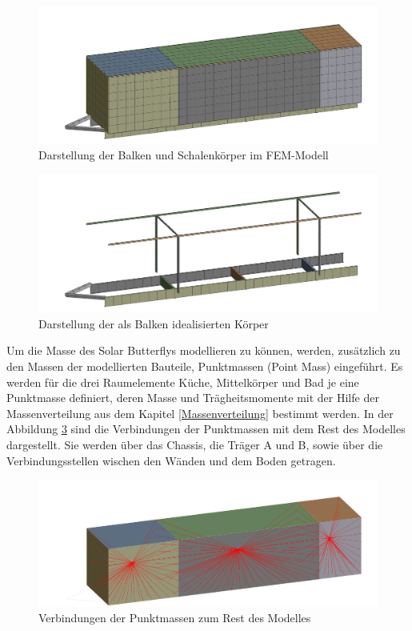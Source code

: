 \begin{figure}[H]
  \centering
  \centering
  \includegraphics[width=.8\linewidth]{04_figures/FEM Mesh1.png}
  \caption{Darstellung der Balken und Schalenkörper im FEM-Modell}
  \label{FEM Mesh1}
\end{figure}
\begin{figure}[H]
  \centering
  \includegraphics[width=.8\linewidth]{04_figures/FEM Mesh3.png}
  \caption{Darstellung der als Balken idealisierten Körper}
  \label{FEM Mesh3}
\end{figure}

Um die Masse des Solar Butterflys modellieren zu können, werden, zusätzlich zu den Massen der modellierten Bauteile, Punktmassen (Point Mass) eingeführt. Es werden für die drei Raumelemente Küche, Mittelkörper und Bad je eine Punktmasse definiert, deren Masse und Trägheitsmomente mit der Hilfe der Massenverteilung aus dem Kapitel \ref{Massenverteilung} bestimmt werden. In der Abbildung \ref{img:FEM Punktmasse} sind die Verbindungen der Punktmassen mit dem Rest des Modelles dargestellt. Sie werden über das Chassis, die Träger A und B, sowie über die Verbindungsstellen wischen den Wänden und dem Boden getragen.\\
\begin{figure}[H]
  \centering
  \includegraphics[width=0.8\linewidth]{04_Figures/FEM Punktmasse.png}
  \caption{Verbindungen der Punktmassen zum Rest des Modelles}
  \label{img:FEM Punktmasse}
\end{figure}

